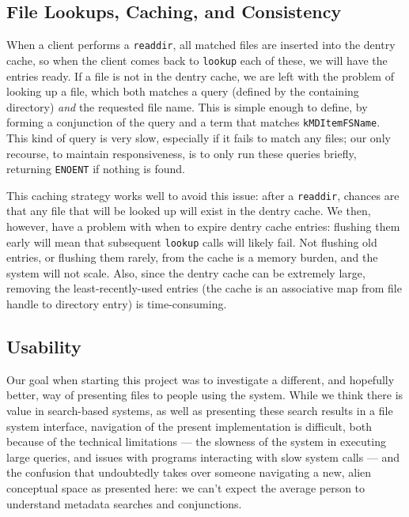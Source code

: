 \documentclass{article}
\begin{document}
\subsection{File Lookups, Caching, and Consistency}

When a client performs a \texttt{readdir}, all matched files are
inserted into the dentry cache, so when the client comes back to
\texttt{lookup} each of these, we will have the entries ready. If a
file is not in the dentry cache, we are left with the problem of
looking up a file, which both matches a query (defined by the
containing directory) \emph{and} the requested file name. This is
simple enough to define, by forming a conjunction of the query and a
term that matches \texttt{kMDItemFSName}. This kind of query is very
slow, especially if it fails to match any files; our only recourse, to
maintain responsiveness, is to only run these queries briefly,
returning \texttt{ENOENT} if nothing is found.

This caching strategy works well to avoid this issue: after a
\texttt{readdir}, chances are that any file that will be looked up
will exist in the dentry cache. We then, however, have a problem with
when to expire dentry cache entries: flushing them early will mean
that subsequent \texttt{lookup} calls will likely fail. Not flushing
old entries, or flushing them rarely, from the cache is a memory
burden, and the system will not scale. Also, since the dentry cache
can be extremely large, removing the least-recently-used entries (the
cache is an associative map from file handle to directory entry) is
time-consuming.

\subsection{Usability}

Our goal when starting this project was to investigate a different,
and hopefully better, way of presenting files to people using the
system. While we think there is value in search-based systems, as well
as presenting these search results in a file system interface,
navigation of the present implementation is difficult, both because of
the technical limitations --- the slowness of the system in executing
large queries, and issues with programs interacting with slow system
calls --- and the confusion that undoubtedly takes over someone
navigating a new, alien conceptual space as presented here: we can't
expect the average person to understand metadata searches and
conjunctions.
\end{document}
